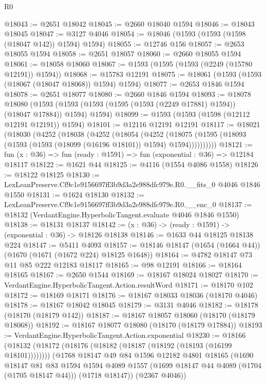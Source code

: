 \begin{lexlean}{R0}
\begin{coremodule}
@18043 := @2651 @18042
@18045 := @2660 @18040 @1594
@18046 := @18043 @18045
@18047 := @3127 @4046
@18054 := @18046 (@1593 (@1593 (@1598 (@18047 @142)) @1594) @1594)
@18055 := @12746 @156
@18057 := @2653 @18055 @1594
@18058 := @2651 @18057
@18060 := @2660 @18055 @1594
@18061 := @18058 @18060
@18067 := @1593 (@1595 (@1593 (@2249 (@15780 @12191)) @1594))
@18068 := @15783 @12191
@18075 := @18061 (@1593 (@1593 (@18067 (@18047 @18068)) @1594) @1594)
@18077 := @2653 @1846 @1594
@18078 := @2651 @18077
@18080 := @2660 @1846 @1594
@18093 := @18078
    @18080
    (@1593 (@1593 (@1593 (@1595 (@1593 (@2249 @17881) @1594)) (@18047 @17884)) @1594) @1594)
@18099 := @1593 (@1593 (@1598 (@12112 @12191 @12191)) @1594)
@18101 := @12116 @12191 @12191
@18117 := @18021
    (@18030
      (@4252
        (@18038
          (@4252
            (@18054
              (@4252
                (@18075 (@1595 (@18093 (@1593 (@1593 (@18099 (@16196 @18101)) @1594) @1594))))))))))
@18121 := fun (x : @36) => fun (ready : @1591) => fun (exponential : @36) => @12184 @18117
@18122 := @1621 @44
@18125 := @4116 (@1554 @4086 @1558)
@18126 := @18122 @18125
@18130 := LexLeanPreserve.Cf9c1e9156697ff3b9d3a2e988dfc979e.R0.__fits_0 @4046 @1846 @1550
@18131 := @1624 @18130
@18132 := LexLeanPreserve.Cf9c1e9156697ff3b9d3a2e988dfc979e.R0.__enc_0
@18137 := @18132 (VerdantEngine.HyperbolicTangent.evaluate @4046 @1846 @1550)
@18138 := @18131 @18137
@18142 := (x : @36) -> (ready : @1591) -> (exponential : @36) -> @18126 @18138
@18146 := @1633 @44 @18125 @18138 @224
@18147 := @5411 @4093
@18157 := @18146 @18147 (@1654 (@1664 @44)) (@1670 (@1671 (@1672 @224) @18125 @1648))
@18164 := @4782 @18147 @73 @11 @85 @222 @12183 @18117
@18165 := @98 @12191
@18166 := @18164 @18165
@18167 := @2650 @1544
@18169 := @18167 @18024 @18027
@18170 := VerdantEngine.HyperbolicTangent.Action.resultWord
@18171 := @18170 @102
@18172 := @18169 @18171
@18176 := @18167 @18033 @18036 (@18170 @4046)
@18178 := @18167 @18042 @18045
@18179 := @3131 @4046
@18182 := @18178 (@18170 (@18179 @142))
@18187 := @18167 @18057 @18060 (@18170 (@18179 @18068))
@18192 := @18167 @18077 @18080 (@18170 (@18179 @17884))
@18193 := VerdantEngine.HyperbolicTangent.Action.exponential
@18230 := @18166
    (@18132 (@18172 (@18176 (@18182 (@18187 (@18192 (@18193 (@16199 @18101))))))))
    (@1768
      @18147
      @49
      @84
      @1596
      @12182
      @4801
      @18165
      (@1690
        @18147
        @81
        @83
        @1594
        @1594
        @4089
        @1557
        (@1699 @18147 @44 @4089 (@1704 (@1705 @18147 @44)))
        (@1718 @18147))
      (@2367 @4046))

\end{coremodule}
\end{lexlean}
